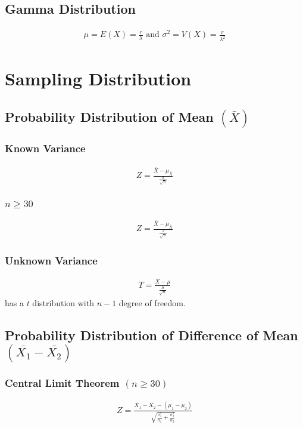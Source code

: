 \documentclass[twocolumn]{article}
\begin{document}
\subsection{Gamma Distribution}
\begin{align*}
    \mu = E(X) = \frac{r}{\lambda} \text{  and  } \sigma^{2} = V(X) = \frac{r}{\lambda^{2}}
\end{align*}

\vfill\break

\section{Sampling Distribution}
\subsection{Probability Distribution of Mean $(\bar{X})$}
\subsubsection{Known Variance}
\begin{align*}
    Z = \frac{\bar{X}-\mu_{\bar{X}}} {\frac{\sigma}{\sqrt{n}}}
\end{align*}
\subsubsection{$n \geq 30$}
\begin{align*}
    Z = \frac{\bar{X}-\mu_{\bar{X}}}{\frac{s}{\sqrt{n}}}
\end{align*}
\subsubsection{Unknown Variance}
\begin{align*}
    T = \frac{X - \mu}{\frac{S}{\sqrt{n}}}
\end{align*}
has a $t$ distribution with $n-1$ degree of freedom.
\subsection{Probability Distribution of Difference of Mean $(\bar{X_{1}}-\bar{X_{2}})$}
\subsubsection{Central Limit Theorem $(n \geq 30)$}
\begin{align*}
    Z = \frac{\bar{X_{1}} - \bar{X_{2}} - (\mu_{1} - \mu_{2})}{\sqrt{\frac{\sigma_{1}^{2}}{n_{1}} + \frac{\sigma_{2}^{2}}{n_{2}}}}
\end{align*}
\end{document}
